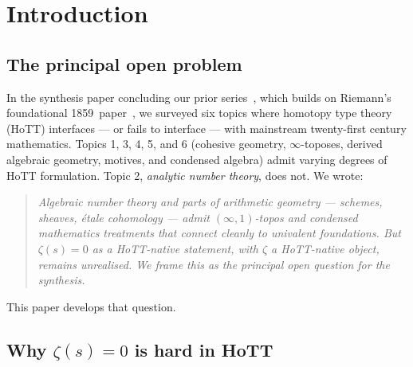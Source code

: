 \documentclass[12pt]{article}
\theoremstyle{definition}
\theoremstyle{remark}
\begin{document}
\tableofcontents

\section{Introduction}\label{sec:intro}

\subsection{The principal open problem}

In the synthesis paper concluding our prior series~\cite{Long2026Synthesis},
which builds on Riemann's foundational
1859~paper~\cite{RiemannHypothesisOriginal},
we surveyed six topics where homotopy type theory (HoTT) interfaces — or
fails to interface — with mainstream twenty-first century mathematics.
Topics 1, 3, 4, 5, and 6 (cohesive geometry, $\infty$-toposes, derived
algebraic geometry, motives, and condensed algebra) admit varying degrees of
HoTT formulation. Topic 2, \emph{analytic number theory}, does not. We wrote:
\begin{quote}
\itshape
Algebraic number theory and parts of arithmetic geometry — schemes, sheaves,
étale cohomology — admit $(\infty,1)$-topos and condensed mathematics
treatments that connect cleanly to univalent foundations. But $\zeta(s)=0$
as a HoTT-native statement, with $\zeta$ a HoTT-native object, remains
unrealised. We frame this as the principal open question for the synthesis.
\end{quote}
This paper develops that question.

\subsection{Why \texorpdfstring{$\zeta(s)=0$}{zeta(s)=0} is hard in HoTT}
\end{document}
